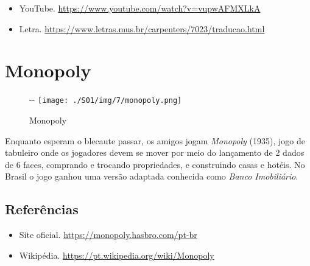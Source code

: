 \begin{itemize}
\tightlist
\item
  \sloppy YouTube. \url{https://www.youtube.com/watch?v=vupwAFMXLkA}
\item
  \sloppy Letra. \url{https://www.letras.mus.br/carpenters/7023/traducao.html}
\end{itemize}

\hypertarget{monopoly}{%
\section{Monopoly}\label{monopoly}}

\begin{figure}[!ht]
  \begin{adjustwidth}{-\oddsidemargin-1in}{-\rightmargin}
    \centering
    \texttt{[image: ./S01/img/7/monopoly.png]}
    \caption{Monopoly\label{fig:monopoly}}
  \end{adjustwidth}
\end{figure}

Enquanto esperam o blecaute passar, os amigos jogam \emph{Monopoly}
(1935), jogo de tabuleiro onde os jogadores devem se mover por meio do
lançamento de 2 dados de 6 faces, comprando e trocando propriedades, e
construindo casas e hotéis. No Brasil o jogo ganhou uma versão adaptada
conhecida como \emph{Banco Imobiliário}.

\hypertarget{referuxeancias-2}{%
\subsection{Referências}\label{referuxeancias-2}}

\begin{itemize}
\tightlist
\item
  \sloppy Site oficial. \url{https://monopoly.hasbro.com/pt-br}
\item
  \sloppy Wikipédia. \url{https://pt.wikipedia.org/wiki/Monopoly}
\end{itemize}
